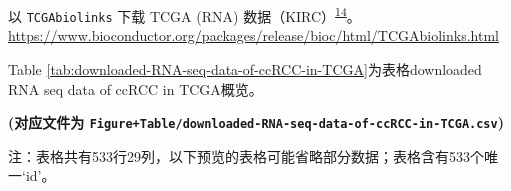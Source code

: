 \documentclass[
]{article}
\begin{document}
以 \texttt{TCGAbiolinks} 下载 TCGA (RNA) 数据（KIRC）\textsuperscript{\protect\hyperlink{ref-TcgabiolinksAColapr2015}{14}}。
\url{https://www.bioconductor.org/packages/release/bioc/html/TCGAbiolinks.html}

Table \ref{tab:downloaded-RNA-seq-data-of-ccRCC-in-TCGA}为表格downloaded RNA seq data of ccRCC in TCGA概览。

\textbf{(对应文件为 \texttt{Figure+Table/downloaded-RNA-seq-data-of-ccRCC-in-TCGA.csv})}

\begin{center}\begin{tcolorbox}[colback=gray!10, colframe=gray!50, width=0.9\linewidth, arc=1mm, boxrule=0.5pt]注：表格共有533行29列，以下预览的表格可能省略部分数据；表格含有533个唯一`id'。
\end{tcolorbox}
\end{center}
\end{document}
